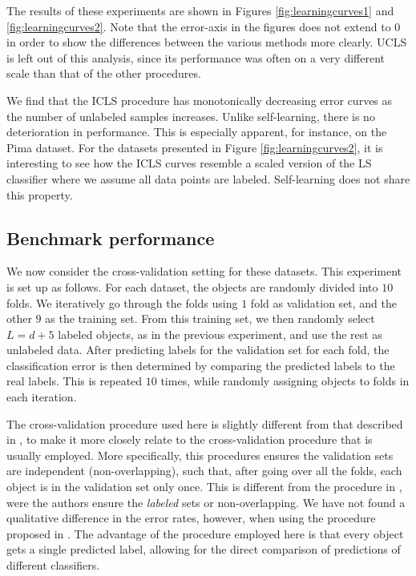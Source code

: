 \documentclass{llncs}
\newcommand{\featdim}{d}
\newcommand{\Nlab}{L}
\begin{document}
The results of these experiments are shown in Figures \ref{fig:learningcurves1} and \ref{fig:learningcurves2}. Note that the error-axis in the figures does not extend to $0$ in order to show the differences between the various methods more clearly. UCLS is left out of this analysis, since its performance was often on a very different scale than that of the other procedures.

We find that the ICLS procedure has monotonically decreasing error curves as the number of unlabeled samples increases. Unlike self-learning, there is no deterioration in performance. This is especially apparent, for instance, on the Pima dataset. For the datasets presented in Figure \ref{fig:learningcurves2}, it is interesting to see how the ICLS curves resemble a scaled version of the LS classifier where we assume all data points are labeled. Self-learning does not share this property.


\subsection{Benchmark performance}
We now consider the cross-validation setting for these datasets. This experiment is set up as follows. For each dataset, the objects are randomly divided into $10$ folds. We iteratively go through the folds using $1$ fold as validation set, and the other $9$ as the training set. From this training set, we then randomly select $\Nlab=\featdim+5$ labeled objects, as in the previous experiment, and use the rest as unlabeled data. After predicting labels for the validation set for each fold, the classification error is then determined by comparing the predicted labels to the real labels. This is repeated $10$ times, while randomly assigning objects to folds in each iteration.

The cross-validation procedure used here is slightly different from that described in \cite{Chapelle2006}, to make it more closely relate to the cross-validation procedure that is usually employed. More specifically, this procedures ensures the validation sets are independent (non-overlapping), such that, after going over all the folds, each object is in the validation set only once. This is different from the procedure in \cite{Chapelle2006}, were the authors ensure the \emph{labeled} sets or non-overlapping. We have not found a qualitative difference in the error rates, however, when using the procedure proposed in \cite{Chapelle2006}. The advantage of the procedure employed here is that every object gets a single predicted label, allowing for the direct comparison of predictions of different classifiers.
\end{document}
